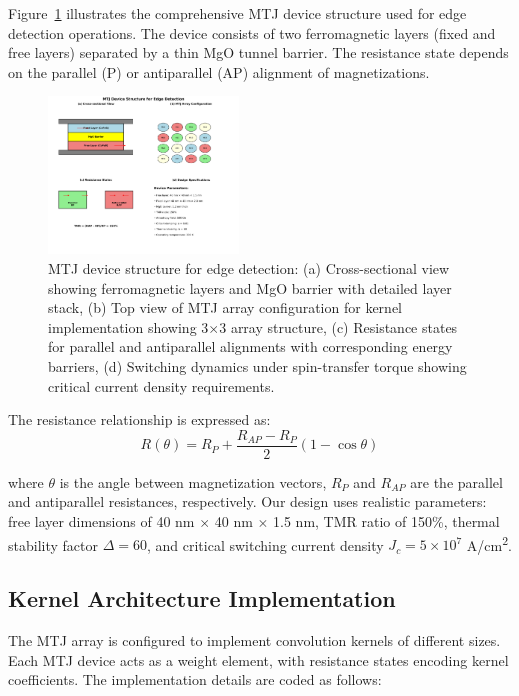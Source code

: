 \documentclass[conference]{IEEEtran}
\begin{document}
Figure~\ref{fig:device_design} illustrates the comprehensive MTJ device structure used for edge detection operations. The device consists of two ferromagnetic layers (fixed and free layers) separated by a thin MgO tunnel barrier. The resistance state depends on the parallel (P) or antiparallel (AP) alignment of magnetizations.

\begin{figure}[htbp]
\centerline{\includegraphics[width=0.45\textwidth]{device_schematic.png}}
\caption{MTJ device structure for edge detection: (a) Cross-sectional view showing ferromagnetic layers and MgO barrier with detailed layer stack, (b) Top view of MTJ array configuration for kernel implementation showing 3$\times$3 array structure, (c) Resistance states for parallel and antiparallel alignments with corresponding energy barriers, (d) Switching dynamics under spin-transfer torque showing critical current density requirements.}
\label{fig:device_design}
\end{figure}

The resistance relationship is expressed as:
\begin{equation}
R(\theta) = R_P + \frac{R_{AP} - R_P}{2}(1 - \cos\theta)
\label{eq:resistance}
\end{equation}

where $\theta$ is the angle between magnetization vectors, $R_P$ and $R_{AP}$ are the parallel and antiparallel resistances, respectively. Our design uses realistic parameters: free layer dimensions of 40 nm $\times$ 40 nm $\times$ 1.5 nm, TMR ratio of 150\%, thermal stability factor $\Delta = 60$, and critical switching current density $J_c = 5 \times 10^7$ A/cm\textsuperscript{2}.

\subsection{Kernel Architecture Implementation}

The MTJ array is configured to implement convolution kernels of different sizes. Each MTJ device acts as a weight element, with resistance states encoding kernel coefficients. The implementation details are coded as follows:
\end{document}
